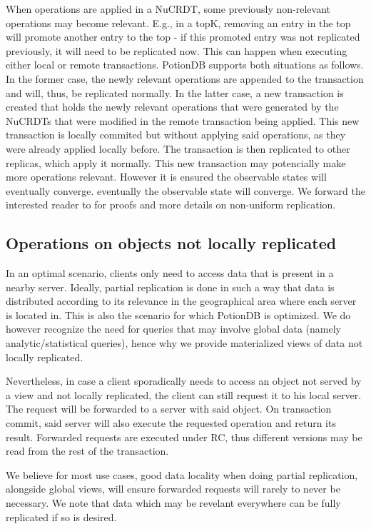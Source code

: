 \documentclass{vldb}
\begin{document}
When operations are applied in a NuCRDT, some previously non-relevant operations may become relevant.
E.g., in a topK, removing an entry in the top will promote another entry to the top - if this promoted entry was not replicated previously, it will need to be replicated now.
This can happen when executing either local or remote transactions.
PotionDB supports both situations as follows.
In the former case, the newly relevant operations are appended to the transaction and will, thus, be replicated normally.
In the latter case, a new transaction is created that holds the newly relevant operations that were generated by the NuCRDTs that were modified in the remote transaction being applied.
This new transaction is locally commited but without applying said operations, as they were already applied locally before.
The transaction is then replicated to other replicas, which apply it normally.
This new transaction may potencially make more operations relevant.
However it is ensured the observable states will eventually converge.
eventually the observable state will converge.
We forward the interested reader to \cite{Cabrita17Nonuniform} for proofs and more details on non-uniform replication.

\subsection{Operations on objects not locally replicated}
\label{subsec:operationsNonLocal}

In an optimal scenario, clients only need to access data that is present in a nearby server.
Ideally, partial replication is done in such a way that data is distributed according to its relevance in the geographical area where each server is located in.
This is also the scenario for which PotionDB is optimized.
We do however recognize the need for queries that may involve global data (namely analytic/statistical queries), hence why we provide materialized views of data not locally replicated.

Nevertheless, in case a client sporadically needs to access an object not served by a view and not locally replicated, the client can still request it to his local server.
The request will be forwarded to a server with said object.
On transaction commit, said server will also execute the requested operation and return its result.
Forwarded requests are executed under RC, thus different versions may be read from the rest of the transaction.

We believe for most use cases, good data locality when doing partial replication, alongside global views, will ensure forwarded requests will rarely to never be necessary.
We note that data which may be revelant everywhere can be fully replicated if so is desired.
\end{document}
